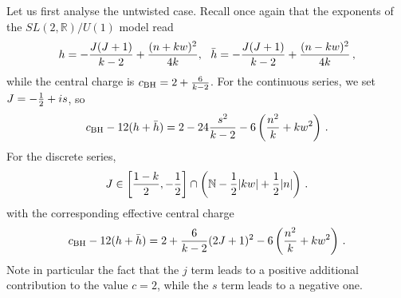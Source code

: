 \documentclass[11pt]{article}
\begin{document}
Let us first analyse the untwisted case. Recall once again that the exponents of the $SL(2,\mathbb{R})/U(1)$ model read
%
\begin{equation}
h=-{J(J+1)\over k-2}+{(n+kw)^2\over 4k},~~\bar{h}=-{J(J+1)\over k-2}+{(n-kw)^2\over 4k} \,,
\end{equation}
%
while the central charge is $c_{\rm BH}=2+{6\over k-2}$. For the continuous series, we set $J=-{1\over 2}+is$, so
%
\begin{equation}
c_{\rm BH}-12(h+\bar{h})=2-24{s^2\over k-2}-6\left({n^2\over k}+kw^2\right) \,.
\end{equation}
%
For the discrete series, 
%
\begin{equation}
J\in \left[{1-k\over 2},-{1\over 2}\right]\cap \left( \mathbb{N}-{1\over 2}|kw|+{1\over 2}|n| \right) \label{discstat} \,.
\end{equation}
%
with 
the corresponding effective central charge 
%
\begin{equation}
c_{\rm BH}-12(h+\bar{h})=2+{6\over k-2}(2J+1)^2-6\left({n^2\over k}+kw^2\right) \,.
\end{equation}
%
Note in particular the fact that the $j$ term leads to a positive additional contribution to the value $c=2$, while the $s$ term leads to a negative one. 
\end{document}
